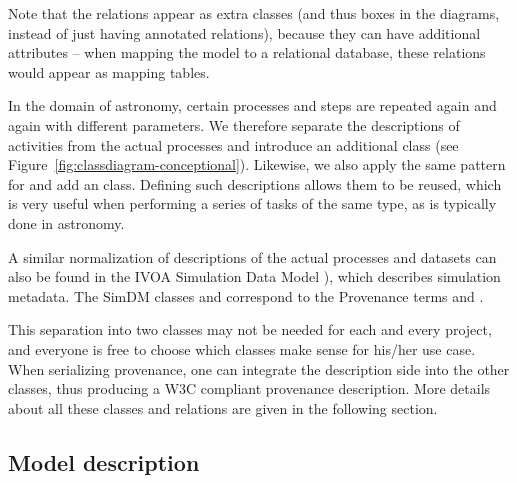 Note that the relations appear as extra classes (and thus boxes in the diagrams, instead of just having annotated relations), because they can have additional attributes -- when mapping the model to a relational database, these relations would appear as mapping tables.

In the domain of astronomy, certain processes and steps are repeated again and 
again with different parameters. We therefore separate the descriptions of activities
from the actual processes and introduce an additional  class (see Figure~\ref{fig:classdiagram-conceptional}).
Likewise, we also apply the same pattern for  and add an 
class.
Defining such descriptions allows them to be reused, which is very useful 
when performing a series of tasks of the same type, as is typically done in 
astronomy. 

A similar normalization of descriptions of the actual processes and datasets 
can also be found in the IVOA Simulation Data Model \citep[SimDM, ][]{std:SimDM}), 
which describes simulation metadata. The SimDM classes  and  
correspond to the Provenance terms  and .


This separation into two classes may not be needed for each and every project,
and everyone is free to choose which classes make sense for his/her use case.
When serializing provenance, one can integrate the description side into the 
other classes, thus producing a W3C compliant provenance description. More details about 
all these classes and relations are given in the following section.





\subsection{Model description}

